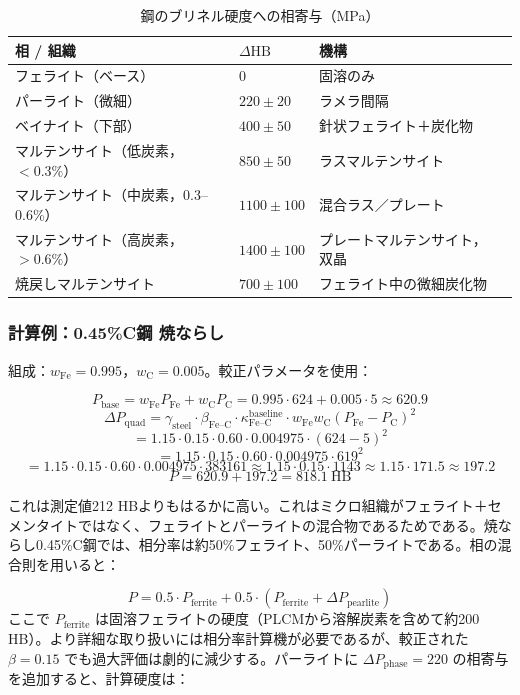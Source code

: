 \documentclass[12pt,a4paper]{article}
\begin{document}
	\begin{longtable}{p{3.5cm} p{3.0cm} p{3.0cm} p{4cm}}
		\caption{鋼のブリネル硬度への相寄与（MPa）}\label{tab:steel_phase_contrib}\\
		\toprule
		\textbf{相 / 組織} & $\Delta\text{HB}$ & \textbf{機構} \\
		\midrule
		フェライト（ベース） & 0 & 固溶のみ \\
		パーライト（微細） & $220 \pm 20$ & ラメラ間隔 \\
		ベイナイト（下部） & $400 \pm 50$ & 針状フェライト＋炭化物 \\
		マルテンサイト（低炭素，$<0.3\%$） & $850 \pm 50$ & ラスマルテンサイト \\
		マルテンサイト（中炭素，0.3–0.6\%） & $1100 \pm 100$ & 混合ラス／プレート \\
		マルテンサイト（高炭素，$>0.6\%$） & $1400 \pm 100$ & プレートマルテンサイト，双晶 \\
		焼戻しマルテンサイト & $700 \pm 100$ & フェライト中の微細炭化物 \\
		\bottomrule
	\end{longtable}
	
	\subsubsection{計算例：0.45\%C鋼 焼ならし}
	
	組成：$w_{\text{Fe}} = 0.995$，$w_{\text{C}} = 0.005$。較正パラメータを使用：
	
	\[
	P_{\text{base}} = w_{\text{Fe}} P_{\text{Fe}} + w_{\text{C}} P_{\text{C}} = 0.995\cdot624 + 0.005\cdot5 \approx 620.9
	\]
	\[
	\Delta P_{\text{quad}} = \gamma_{\text{steel}} \cdot \beta_{\text{Fe–C}} \cdot \kappa_{\text{Fe–C}}^{\text{baseline}} \cdot w_{\text{Fe}} w_{\text{C}} (P_{\text{Fe}}-P_{\text{C}})^2
	\]
	\[
	= 1.15 \cdot 0.15 \cdot 0.60 \cdot 0.004975 \cdot (624-5)^2
	\]
	\[
	= 1.15 \cdot 0.15 \cdot 0.60 \cdot 0.004975 \cdot 619^2
	\]
	\[
	= 1.15 \cdot 0.15 \cdot 0.60 \cdot 0.004975 \cdot 383161 \approx 1.15 \cdot 0.15 \cdot 1143 \approx 1.15 \cdot 171.5 \approx 197.2
	\]
	\[
	P = 620.9 + 197.2 = 818.1\ \text{HB}
	\]
	
	これは測定値212 HBよりもはるかに高い。これはミクロ組織がフェライト＋セメンタイトではなく、フェライトとパーライトの混合物であるためである。焼ならし0.45\%C鋼では、相分率は約50\%フェライト、50\%パーライトである。相の混合則を用いると：
	
	\[
	P = 0.5 \cdot P_{\text{ferrite}} + 0.5 \cdot (P_{\text{ferrite}} + \Delta P_{\text{pearlite}})
	\]
	ここで $P_{\text{ferrite}}$ は固溶フェライトの硬度（PLCMから溶解炭素を含めて約200 HB）。より詳細な取り扱いには相分率計算機が必要であるが、較正された $\beta = 0.15$ でも過大評価は劇的に減少する。パーライトに $\Delta P_{\text{phase}} = 220$ の相寄与を追加すると、計算硬度は：
	
\end{document}
